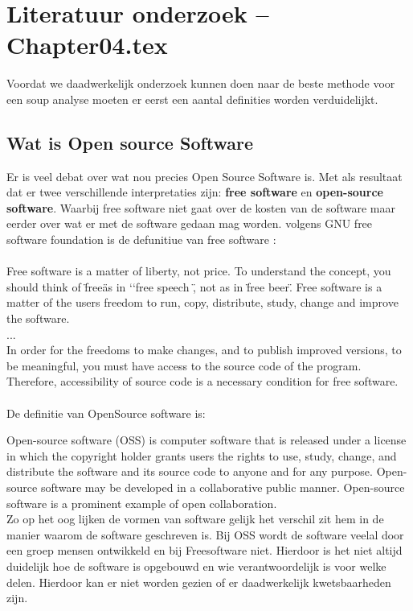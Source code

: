 
\chapter{Literatuur onderzoek -- Chapter04.tex} %

\label{ondMarkt} %

Voordat we daadwerkelijk onderzoek kunnen doen naar de beste methode voor een soup analyse moeten er eerst een aantal definities worden verduidelijkt.
\section{ Wat is Open source Software}
Er is veel debat over wat nou precies Open Source Software is. Met als resultaat dat er twee verschillende interpretaties zijn: \textbf{free software} en \textbf{open-source software}. Waarbij free software niet gaat over de kosten van de software maar eerder over wat er met de software gedaan mag worden. volgens GNU free software foundation is de defunitiue van free software : \\ \\

Free software is a matter of liberty, not price. To understand the concept, you should think of  \"free\" as in ‘‘free speech \", not as in \"free beer\". Free software is a matter of the users freedom to run, copy, distribute, study, change and improve the software. \\ ... \\
In order for the freedoms to make changes, and to publish improved versions, to be meaningful, you must have access to the source code of the program. Therefore, accessibility of source code is a necessary condition for free software.\\ \\

De definitie van OpenSource software is: 

Open-source software (OSS) is computer software that is released under a license in which the copyright holder grants users the rights to use, study, change, and distribute the software and its source code to anyone and for any purpose. Open-source software may be developed in a collaborative public manner. Open-source software is a prominent example of open collaboration. 
\\
Zo op het oog lijken de vormen van software gelijk het verschil zit hem in de manier waarom de software geschreven is. Bij OSS wordt de software veelal door een groep mensen ontwikkeld en bij Freesoftware niet. Hierdoor is het niet altijd duidelijk hoe de software is opgebouwd en wie verantwoordelijk is voor welke delen. Hierdoor kan er niet worden gezien of er daadwerkelijk kwetsbaarheden zijn. 
\\

